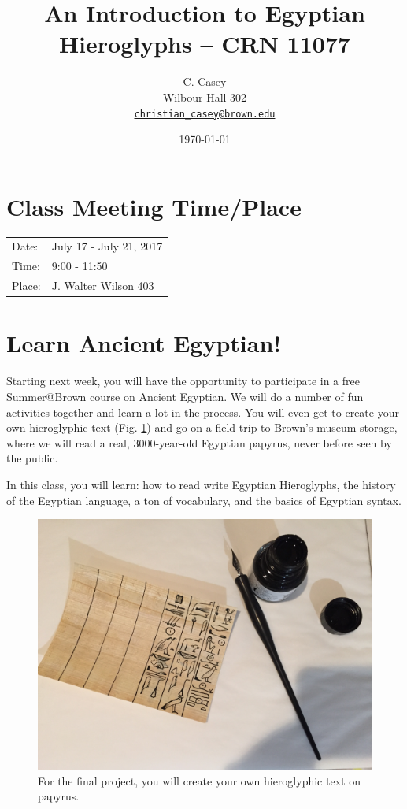 \documentclass[11pt]{article}
\begin{document}
	
	\title{An Introduction to Egyptian Hieroglyphs -- CRN 11077}
	\author{C. Casey \\
		Wilbour Hall 302 \\
  		\texttt{\href{mailto:christian_casey@brown.edu}{christian\_casey@brown.edu}}}
	\date{\today}
	\maketitle
	
	\section*{Class Meeting Time/Place}
	
		\begin{tabular}{l l}
		Date: & July 17 - July 21, 2017 \\
		Time: & 9:00 - 11:50 \\
		Place: & J. Walter Wilson 403
		\end{tabular} 
		
	\section*{Learn Ancient Egyptian!}
		
		Starting next week, you will have the opportunity to participate in a free Summer@Brown course on Ancient Egyptian.
		We will do a number of fun activities together and learn a lot in the process. 
		You will even get to create your own hieroglyphic text (Fig. \ref{figPapyrus}) and go on a field trip to Brown's museum storage, where we will read a real, 3000-year-old Egyptian papyrus, never before seen by the public.
		
		In this class, you will learn: 
			how to read write Egyptian Hieroglyphs, 
			the history of the Egyptian language, 
			a ton of vocabulary, 
			and the basics of Egyptian syntax.
		
		\begin{figure}[!h]
		\centering
		\includegraphics[scale=0.05]{cursive}
		\caption{For the final project, you will create your own hieroglyphic text on papyrus.}
		\label{figPapyrus}
		\end{figure}
		
\end{document}
